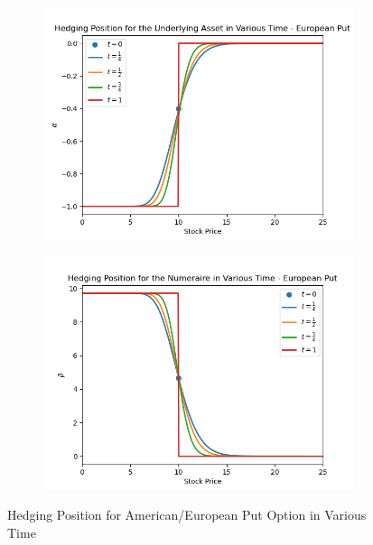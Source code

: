\documentclass[12pt]{article}
\begin{document}
\begin{figure}[H]
  \centering
  \begin{subfigure}{.5\textwidth}
    \centering
    \includegraphics[width=\linewidth]{3a-ii-ep-alpha.png}
  \end{subfigure}%
  \begin{subfigure}{.5\textwidth}
    \centering
    \includegraphics[width=\linewidth]{3a-ii-ep-beta.png}
  \end{subfigure}%
  \caption[Hedging Position for American/European Put Option in Various Time]{Hedging Position for American/European Put Option in Various Time}
\end{figure}
\end{document}
